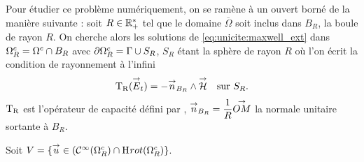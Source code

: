 
  Pour étudier ce problème numériquement, on se ramène à un ouvert borné de la manière suivante : soit \(R\in\RR_+^*\) tel que le domaine \(\overline{\Omega}\) soit inclus dans \(B_R\), la boule de rayon \(R\).
  On cherche alors les solutions de \eqref{eq:unicite:maxwell_ext} dans \(\OO^c_R=\OO^c\cap B_R\) avec \(\partial\OO^c_R = \Gamma\cup S_R\), \(S_R\) étant la sphère de rayon \(R\) où l'on écrit la condition de rayonnement à l'infini
  \begin{equation}
    \label{eq:unicite:TR}
    \begin{aligned}
    \Tr(\vE_t) = - \vn_{B_R} \pvect \vH && \text{sur \(S_R\).}
    \end{aligned}
  \end{equation}
  \(\Tr\) est l'opérateur de capacité défini par \cite[p.~200]{nedelec_acoustic_2001}, \(\vn_{B_R}=\frac{1}{R}\vect{OM}\) la normale unitaire sortante à \(B_R\).

  Soit \(V = \lbrace \vect{u} \in (\mathcal{C}^\infty(\OO^c_R)\cap\Sobolev[rot](\OO^c_R) \rbrace\).

